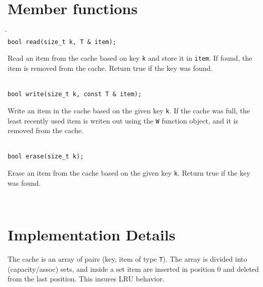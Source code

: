 \documentclass[11pt]{article}
\begin{document}
\section{Member functions}
   \begin{tabbing}
   \hspace*{.3in} \= \hspace{.5in} \= \\ 

   \> {\tt  bool read(size\_t k, T \& item);}\\ 
   \>\>\parbox[t]{5.5in}{Read an item from the cache based on key {\tt k} and store it in {\tt item}. If found, the item is removed from the cache. Return true if the key was found.}\\[3mm]

   \> {\tt  bool write(size\_t k, const T \& item);}\\ 
   \>\>\parbox[t]{5.5in}{Write an item in the cache based on the given key {\tt k}. If the cache was full, the least recently used item is writen out using the {\tt W} function object, and it is removed from the cache.}\\[3mm]

   \> {\tt  bool erase(size\_t k);}\\ 
   \>\>\parbox[t]{5.5in}{Erase an item from the cache based on the given key {\tt k}. Return true if the key was found.}\\[3mm]
   \end{tabbing}

\section{Implementation Details}

The cache is an array of pairs (key, item of type {\tt T}). The array is divided into (capacity/assoc) sets, and inside a set item are inserted in position 0 and deleted from the last position. This insures LRU behavior.
\end{document}
